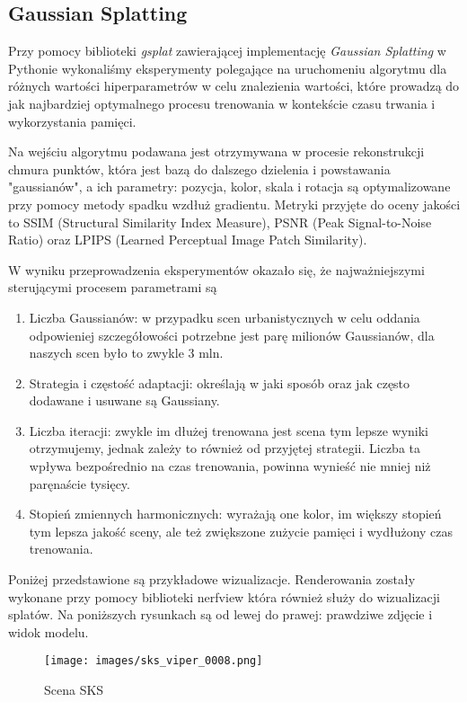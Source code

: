 \subsection{Gaussian Splatting}
Przy pomocy biblioteki \textit{gsplat}\cite{ye2024gsplatopensourcelibrarygaussian} zawierającej implementację \textit{Gaussian Splatting} w Pythonie wykonaliśmy eksperymenty polegające na uruchomeniu algorytmu dla różnych wartości hiperparametrów w celu znalezienia wartości, które prowadzą do jak najbardziej optymalnego procesu trenowania w kontekście czasu trwania i wykorzystania pamięci. 

Na wejściu algorytmu podawana jest otrzymywana w procesie rekonstrukcji chmura punktów, która jest bazą do dalszego dzielenia i powstawania "gaussianów", a ich parametry: pozycja, kolor, skala i rotacja są optymalizowane przy pomocy metody spadku wzdłuż gradientu. Metryki przyjęte do oceny jakości to SSIM (Structural Similarity Index Measure), PSNR (Peak Signal-to-Noise Ratio) oraz LPIPS (Learned Perceptual Image Patch Similarity).

W wyniku przeprowadzenia eksperymentów okazało się, że najważniejszymi sterującymi procesem parametrami są 
\begin{enumerate}
    \item Liczba Gaussianów: w przypadku scen urbanistycznych w celu oddania odpowieniej szczegółowości potrzebne jest parę milionów Gaussianów, dla naszych scen było to zwykle 3 mln.
    \item Strategia i częstość adaptacji: określają w jaki sposób oraz jak często dodawane i usuwane są Gaussiany. 
    \item Liczba iteracji: zwykle im dłużej trenowana jest scena tym lepsze wyniki otrzymujemy, jednak zależy to również od przyjętej strategii. Liczba ta wpływa bezpośrednio na czas trenowania, powinna wynieść nie mniej niż paręnaście tysięcy.
    \item Stopień zmiennych harmonicznych: wyrażają one kolor, im większy stopień tym lepsza jakość sceny, ale też zwiększone zużycie pamięci i wydłużony czas trenowania. 
\end{enumerate}

Poniżej przedstawione są przykładowe wizualizacje. Renderowania zostały wykonane przy pomocy biblioteki nerfview która również służy do wizualizacji splatów. Na poniższych rysunkach są od lewej do prawej: prawdziwe zdjęcie i widok modelu.

\begin{figure}[!h]
    \centering
    \texttt{[image: images/sks\_viper\_0008.png]}
    \caption{Scena SKS}
    \label{fig:sks_gs}
\end{figure}

